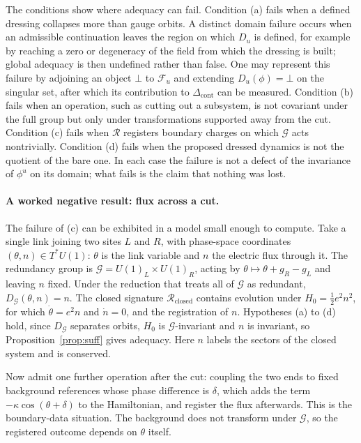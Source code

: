 \documentclass[11pt]{article}
\theoremstyle{plain}
\theoremstyle{definition}
\theoremstyle{remark}
\newcommand{\F}{\mathcal F}
\newcommand{\G}{\mathcal G}
\newcommand{\R}{\mathcal R}
\begin{document}
The conditions show where adequacy can fail. Condition (a) fails when a defined dressing collapses more than gauge orbits. A distinct domain failure occurs when an admissible continuation leaves the region on which $D_u$ is defined, for example by reaching a zero or degeneracy of the field from which the dressing is built; global adequacy is then undefined rather than false. One may represent this failure by adjoining an object $\bot$ to $\F_u$ and extending $D_u(\phi)=\bot$ on the singular set, after which its contribution to $\Delta_{\mathrm{cont}}$ can be measured. Condition (b) fails when an operation, such as cutting out a subsystem, is not covariant under the full group but only under transformations supported away from the cut. Condition (c) fails when $\R$ registers boundary charges on which $\G$ acts nontrivially. Condition (d) fails when the proposed dressed dynamics is not the quotient of the bare one. In each case the failure is not a defect of the invariance of $\phi^u$ on its domain; what fails is the claim that nothing was lost.

\paragraph{A worked negative result: flux across a cut.} The failure of (c) can be exhibited in a model small enough to compute. Take a single link joining two sites $L$ and $R$, with phase-space coordinates $(\theta,n)\in T^*U(1)$: $\theta$ is the link variable and $n$ the electric flux through it. The redundancy group is $\G=U(1)_L\times U(1)_R$, acting by $\theta\mapsto\theta+g_R-g_L$ and leaving $n$ fixed. Under the reduction that treats all of $\G$ as redundant, $D_\G(\theta,n)=n$. The closed signature $\R_{\mathrm{closed}}$ contains evolution under $H_0=\tfrac12e^2n^2$, for which $\dot\theta=e^2n$ and $\dot n=0$, and the registration of $n$. Hypotheses (a) to (d) hold, since $D_\G$ separates orbits, $H_0$ is $\G$-invariant and $n$ is invariant, so Proposition~\ref{prop:suff} gives adequacy. Here $n$ labels the sectors of the closed system and is conserved.

Now admit one further operation after the cut: coupling the two ends to fixed background references whose phase difference is $\delta$, which adds the term $-\kappa\cos(\theta+\delta)$ to the Hamiltonian, and register the flux afterwards. This is the boundary-data situation. The background does not transform under $\G$, so the registered outcome depends on $\theta$ itself.
\end{document}
